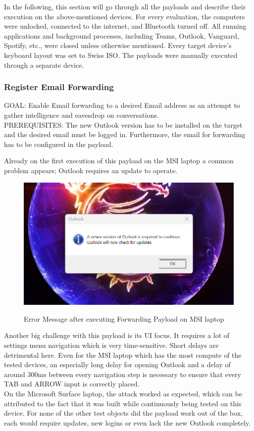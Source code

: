 In the following, this section will go through all the payloads and describe their execution on the above-mentioned devices. For every evaluation, the computers were unlocked, connected to the internet, and Bluetooth turned off. All running applications and background processes, including Teams, Outlook, Vanguard, Spotify, etc., were closed unless otherwise mentioned. Every target device's keyboard layout was set to Swiss ISO. The payloads were manually executed through a separate device. 

\subsubsection{Register Email Forwarding}

GOAL: Enable Email forwarding to a desired Email address as an attempt to gather intelligence and eavesdrop on conversations. \\
PREREQUISITES: The new Outlook version has to be installed on the target and the desired email must be logged in. Furthermore, the email for forwarding has to be configured in the payload. 

Already on the first execution of this payload on the MSI laptop a common problem appears; Outlook requires an update to operate. 

\begin{figure}[H]
    \centering
    \includegraphics[width=0.5\linewidth]{visuals/outlook_requires_update.jpeg}
    \caption{Error Message after executing Forwarding Payload on MSI laptop}
    \label{fig:builtInTeensy}
    \cite{farhiMalboardNovelUser2019}
\end{figure}


Another big challenge with this payload is its UI focus. It requires a lot of settings menu navigation which is very time-sensitive. Short delays are detrimental here. Even for the MSI laptop which has the most compute of the tested devices, an especially long delay for opening Outlook and a delay of around 300ms between every navigation step is necessary to ensure that every TAB and ARROW input is correctly placed. \\
On the Microsoft Surface laptop, the attack worked as expected, which can be attributed to the fact that it was built while continuously being tested on this device. For none of the other test objects did the payload work out of the box, each would require updates, new logins or even lack the new Outlook completely. 

